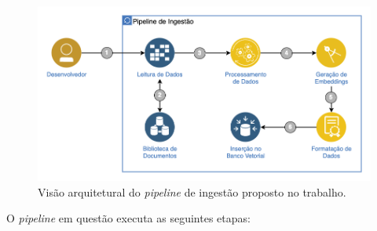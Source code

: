 \documentclass[a4paper, 12pt]{article}
\begin{document}
    \begin{figure}
        \includegraphics[width=\textwidth,height=0.9\textheight,keepaspectratio]{architecture-pipeline.png}
        \centering
        \caption{Visão arquitetural do \textit{pipeline} de ingestão proposto no trabalho.}
        \centering
        \label{fig:pipeline_scheme}
    \end{figure}
    
    O \textit{pipeline} em questão executa as seguintes etapas: 
    
\end{document}
